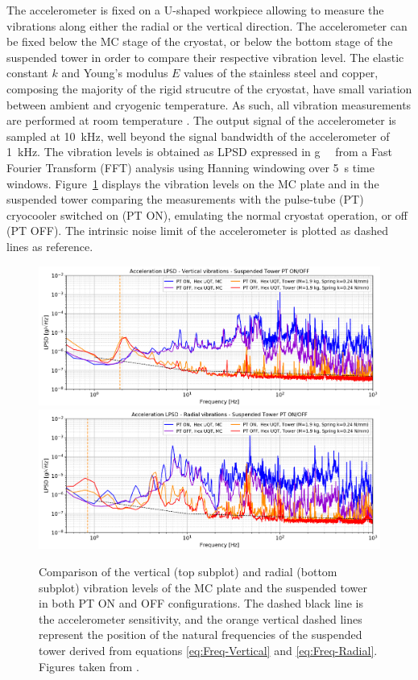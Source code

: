 The accelerometer is fixed on a U-shaped workpiece allowing to measure the vibrations along either the radial or the vertical direction.  The accelerometer can be fixed below the MC stage of the cryostat, or below the bottom stage of the suspended tower in order to compare their respective vibration level. 
The elastic constant $k$ and Young's modulus $E$ values of the stainless steel and copper, composing the majority of the rigid strucutre of the cryostat, have small variation between ambient and cryogenic temperature. As such, all vibration measurements are performed at room temperature \cite{Emodulus}.
The output signal of the accelerometer is sampled at \SI{10}{\kilo\Hz}, well beyond the signal bandwidth of the accelerometer of \SI{1}{\kilo\Hz}. The vibration levels is obtained as LPSD expressed in \si{g \per \sqrthz} from a Fast Fourier Transform (FFT) analysis using Hanning windowing over \SI{5}{\s} time windows.
Figure~\ref{fig:vibration-levels} displays the vibration levels on the MC plate and in the suspended tower comparing the measurements with the pulse-tube (PT) cryocooler switched on (PT ON), emulating the normal cryostat operation, or off (PT OFF). The intrinsic noise limit of the accelerometer is plotted as dashed lines as reference.

\begin{figure}
\centering 
\includegraphics[width=\textwidth]{Figures/Experiment/vibration_vertical.pdf}
\includegraphics[width=\textwidth]{Figures/Experiment/vibration_radial.pdf}
\caption{Comparison of the vertical (top subplot) and radial (bottom subplot) vibration levels of the MC plate and the suspended tower in both PT ON and OFF configurations. The dashed black line is the accelerometer sensitivity, and the orange vertical dashed lines represent the position of the natural frequencies of the suspended tower derived from equations \ref{eq:Freq-Vertical} and \ref{eq:Freq-Radial}. Figures taken from \cite{Maisonobe:2018tbq}.}
\label{fig:vibration-levels}
\end{figure}

